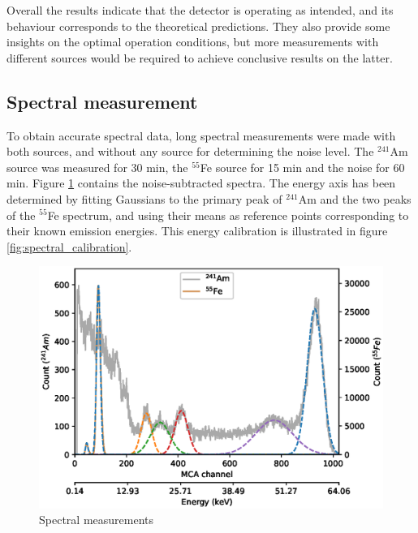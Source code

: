 \documentclass[a4paper]{article}
\begin{document}
\FloatBarrier
Overall the results indicate that the detector is operating as intended, and its behaviour corresponds to the theoretical predictions.
They also provide some insights on the optimal operation conditions, but more measurements with different sources would be required to achieve conclusive results on the latter.



\clearpage
\subsection{Spectral measurement}
\label{results_spectral}
To obtain accurate spectral data, long spectral measurements were made with both sources, and without any source for determining the noise level.
The $^{241}$Am source was measured for 30 min, the $^{55}$Fe source for 15 min and the noise for 60 min.
Figure \ref{fig:spectra} contains the noise-subtracted spectra.
The energy axis has been determined by fitting Gaussians to the primary peak of $^{241}$Am and the two peaks of the $^{55}$Fe spectrum, and using their means as reference points corresponding to their known emission energies.
This energy calibration is illustrated in figure \ref{fig:spectral_calibration}.

\begin{figure}[ht!]
\centering
\includegraphics[width=\textwidth]{fig/python/spectra.eps}
\caption{Spectral measurements}
\label{fig:spectra}
\end{figure}
\end{document}
